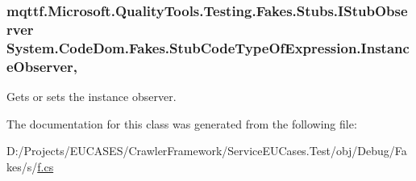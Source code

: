 \hypertarget{class_system_1_1_code_dom_1_1_fakes_1_1_stub_code_type_of_expression_ab5140df188e42c1f7bfa2952846e7be2}{
\subsubsection[{Instance\-Observer}]{\setlength{\rightskip}{0pt plus 5cm}mqttf.\-Microsoft.\-Quality\-Tools.\-Testing.\-Fakes.\-Stubs.\-I\-Stub\-Observer System.\-Code\-Dom.\-Fakes.\-Stub\-Code\-Type\-Of\-Expression.\-Instance\-Observer\hspace{0.3cm}{\ttfamily [get]}, {\ttfamily [set]}}}\label{class_system_1_1_code_dom_1_1_fakes_1_1_stub_code_type_of_expression_ab5140df188e42c1f7bfa2952846e7be2}


Gets or sets the instance observer.



The documentation for this class was generated from the following file\-:\begin{DoxyCompactItemize}
\item 
D\-:/\-Projects/\-E\-U\-C\-A\-S\-E\-S/\-Crawler\-Framework/\-Service\-E\-U\-Cases.\-Test/obj/\-Debug/\-Fakes/s/\hyperlink{s_2f_8cs}{f.\-cs}\end{DoxyCompactItemize}
